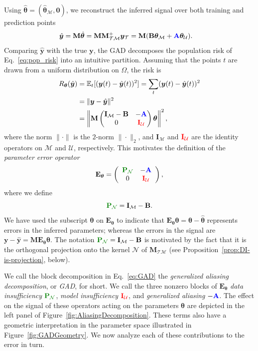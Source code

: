 \documentclass[twocolumn,aps,prx,superscriptaddress,10pt]{revtex4-2}
\newcommand{\by}{\bm{y}}
\newcommand{\0}{\bm{0}}
\newcommand{\btheta}{\boldsymbol{\theta}}
\newcommand{\M}{\mathcal{M}} %
\newcommand{\K}{\mathcal{N}} %
\newcommand{\T}{\mathcal{T}} %
\newcommand{\U}{\mathcal{U}} %
\newcommand{\bbA}{{\color{blue}{\mathbf{A}}}}  %
\newcommand{\bbIU}{{\color{red}{\bbI_{\U}}}}  %
\newcommand{\bbPN}{{\color{Green}{\mathbf{P}_{\K}}}} %
\newcommand{\bbB}{\mathbf{B}}
\newcommand{\bbE}{\mathbf{E}}
\newcommand{\bbI}{\mathbf{I}}
\newcommand{\bbM}{\mathbf{M}}
\newcommand{\MTM}{\bbM_{\T\M}}
\newcommand{\ev}{\mathbb{E}} %
\begin{document}
Using $\hat{\btheta} = (\hat{\btheta}_\M, \0)$, we reconstruct the inferred signal over both training and prediction points
\begin{align}
  \label{eq:predictions}
  \hat{\by} & = \bbM \hat{\btheta}  = \bbM \MTM^+ \by_\T %
  = \bbM ( \bbB \btheta_\M  + \bbA \btheta_\U).
\end{align}
Comparing  $\hat{\by}$ with the true 
$  \by $,
the GAD decomposes the population risk of Eq.~\eqref{eq:pop_risk} into an intuitive partition.
Assuming that the points $t$ are drawn from a uniform distribution on $\Omega$, the risk is
\begin{align}
R_{\btheta}(\hat{\by}) &=  \ev_t [(\by(t) - \hat{\by}(t))^2]%
= \sum_{t} (\by(t) - \hat{\by}(t))^2\notag\\
& = \|\by - \hat{\by}\|^2  \label{eq:ey}  \\
& = \left \| \bbM
    \begin{pmatrix}
           {{\bbI_{\M} - \bbB}} & -\bbA \\
            0 &  \bbIU
    \end{pmatrix}
     \btheta \right\|^2, \label{eq:GAD-risk}
\end{align}
where the norm $\|\cdot\|$ is the $2$-norm $\|\cdot\|_2$, and ${\bbI_{\M}}$ and $\bbIU$ are the identity operators on $\M$ and $\U$, respectively.
This  motivates the definition of the \emph{parameter error operator}
\begin{align}
  \bbE_{\btheta} = \left(
          \begin{array}{cc}
            \bbPN & {-\bbA} \\
            0 & \bbIU
          \end{array}
  \right),
  \label{eq:GAD}
\end{align}
where we define
\[
\bbPN = \bbI_\M - \bbB.
\]
We have used the subscript $\btheta$  on $\bbE_{\btheta}$ to indicate that $\bbE_{\btheta} \btheta = \btheta - \hat{\btheta}$ represents errors in the inferred parameters; whereas the errors in the signal are $\by-\hat{\by} = \bbM \bbE_{\btheta} \btheta$.  The notation $\bbPN = \bbI_\M - \bbB$ is motivated  by the fact that it is the orthogonal projection onto the kernel $\K$ of $\MTM$ (see Proposition~\ref{prop:DI-is-projection}, below).

We call the block decomposition in Eq.~\eqref{eq:GAD} the \emph{generalized aliasing decomposition}, or \emph{GAD}, for short.
We call the three nonzero blocks of $\bbE_{\btheta}$ \emph{data insufficiency} $\bbPN$, \emph{model insufficiency} $\bbIU$, and \emph{generalized aliasing} $-\bbA$.  The effect on the signal of these operators acting on the parameters $\btheta$ are depicted in the left panel of Figure~\ref{fig:AliasingDecomposition}.
These terms also have a geometric interpretation in the parameter space illustrated in Figure~\ref{fig:GADGeometry}.
We now analyze each of these contributions to the error in turn.
\end{document}
